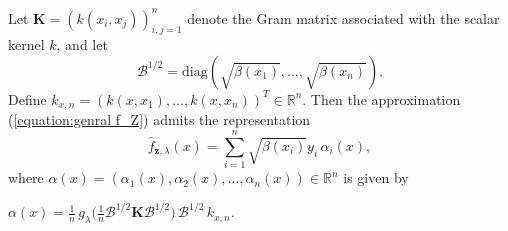 \documentclass[twoside,11pt]{article}
\begin{document}
\begin{proposition}
Let $\mathbf{K} = (k(x_i,x_j))_{i,j=1}^n$ denote the Gram matrix associated with the scalar kernel $k$, 
and let
\[
\mathcal B^{1/2}
=
\mathrm{diag}\left(\sqrt{\beta(x_1)}, \dots, \sqrt{\beta(x_n)}\right).
\]
{Define $k_{x,n} = (k(x,x_1), \ldots, k(x,x_n))^T \in \mathbb{R}^n$.} 
Then the approximation
(\ref{equation:genral f_Z}) 
admits the representation
\[
\widehat{f}_{\mathbf{z},\lambda}(x) = \sum_{i=1}^n \sqrt{\beta(x_i)} y_i \, \alpha_i(x),
\]
where  $\alpha(x) = (\alpha_1(x),\alpha_2(x),\ldots,\alpha_n(x)) \in \mathbb{R}^n$ is given by
\begin{center}
    $\alpha(x) = \frac{1}{n}\, g_\lambda\!\Big(\frac{1}{n}\mathcal B^{1/2} \mathbf{K}\mathcal B^{1/2}\Big)\,\mathcal B^{1/2} \,k_{x,n}.$
\end{center}
\end{proposition}
\end{document}
